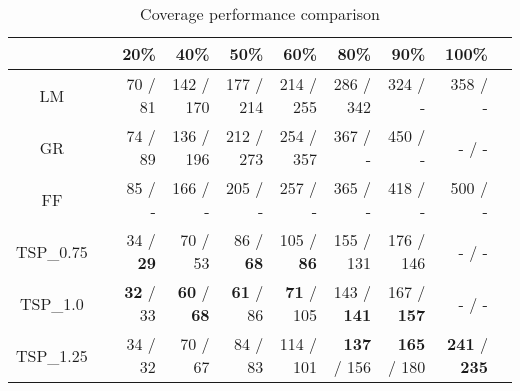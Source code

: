 \begin{table*}%
\caption{Coverage performance comparison} %
\centering %
\begin{tabular}{c rrrrrrrrr} %
\hline\hline %
  & \vline & 20\% & 40\% & 50\% & 60\% & 80\% & 90\% & 100\% \\
\hline %
LM & \vline & 70 / 81 & 142 / 170 & 177 / 214 & 214 / 255 & 286 / 342 & 324 / - &  358 / -\\ [1ex]%
GR & \vline & 74 / 89 & 136 / 196 & 212 / 273 & 254 / 357 & 367 / - & 450 / - & - / -\\ [1ex]%
FF & \vline & 85 / - & 166 / - & 205 / - & 257 / - & 365 / - & 418 / - & 500 / - \\ [1ex]
TSP\_0.75 & \vline & 34 / \textbf{29} & 70 / 53 & 86 / \textbf{68} & 105 / \textbf{86} & 155 / 131 & 176 / 146 & - / - \\ [1ex]
TSP\_1.0 & \vline & \textbf{32} / 33 & \textbf{60} / \textbf{68} & \textbf{61} / 86 & \textbf{71} / 105 & 143 / \textbf{141} & 167 / \textbf{157} & - / - \\ [1ex]
TSP\_1.25 & \vline & 34  / 32 & 70 / 67 & 84 / 83 & 114 / 101 & \textbf{137} / 156 & \textbf{165} / 180 & \textbf{241} / \textbf{235} \\
\hline %
\end{tabular}
\label{tb:coverage_comparison}
\end{table*}

